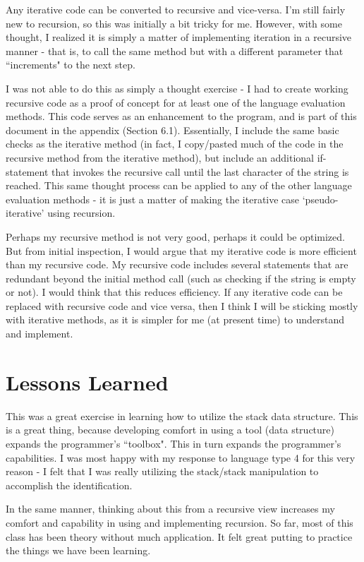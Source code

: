 \documentclass[12pt, titlepage]{article}
\begin{document}
Any iterative code can be converted to recursive and vice-versa. I'm still fairly new to recursion, so this was initially a bit tricky for me. However, with some thought, I realized it is simply a matter of implementing iteration in a recursive manner - that is, to call the same method but with a different parameter that ``increments" to the next step. 

I was not able to do this as simply a thought exercise - I had to create working recursive code as a proof of concept for at least one of the language evaluation methods. This code serves as an enhancement to the program, and is part of this document in the appendix (Section 6.1). Essentially, I include the same basic checks as the iterative method (in fact, I copy/pasted much of the code in the recursive method from the iterative method), but include an additional if-statement that invokes the recursive call until the last character of the string is reached. This same thought process can be applied to any of the other language evaluation methods - it is just a matter of making the iterative case `pseudo-iterative' using recursion.

Perhaps my recursive method is not very good, perhaps it could be optimized. But from initial inspection, I would argue that my iterative code is more efficient than my recursive code. My recursive code includes several statements that are redundant beyond the initial method call (such as checking if the string is empty or not). I would think that this reduces efficiency. If any iterative code can be replaced with recursive code and vice versa, then I think I will be sticking mostly with iterative methods, as it is simpler for me (at present time) to understand and implement. 

\section{Lessons Learned}

This was a great exercise in learning how to utilize the stack data structure. This is a great thing, because developing comfort in using a tool (data structure) expands the programmer's ``toolbox". This in turn expands the programmer's capabilities. I was most happy with my response to language type 4 for this very reason - I felt that I was really utilizing the stack/stack manipulation to accomplish the identification. 

In the same manner, thinking about this from a recursive view increases my comfort and capability in using and implementing recursion. So far, most of this class has been theory without much application. It felt great putting to practice the things we have been learning.
\end{document}
